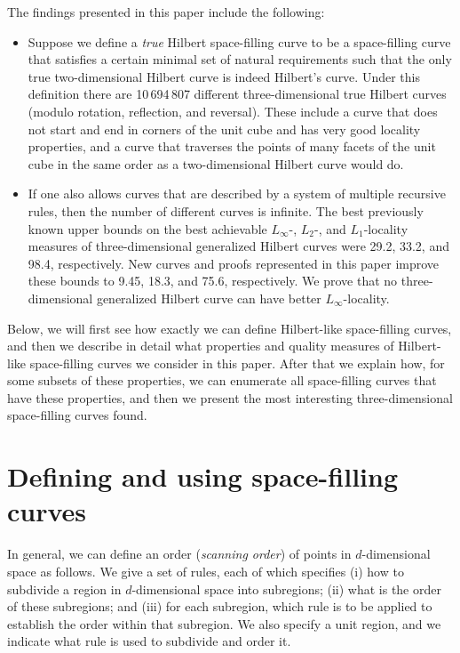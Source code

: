 \documentclass[11pt,a4paper]{article}
\begin{document}
The findings presented in this paper include the following:\begin{itemize}
\item Suppose we define a \emph{true} Hilbert space-filling curve to be a space-filling curve that satisfies a certain minimal set of natural requirements such that the only true two-dimensional Hilbert curve is indeed Hilbert's curve. Under this definition there are 10\,694\,807 different three-dimensional true Hilbert curves (modulo rotation, reflection, and reversal). These include a curve that does not start and end in corners of the unit cube and has very good locality properties, and a curve that traverses the points of many facets of the unit cube in the same order as a two-dimensional Hilbert curve would do.
\item If one also allows curves that are described by a system of multiple recursive rules, then the number of different curves is infinite.
    The best previously known upper bounds on the best achievable $L_\infty$-, $L_2$-, and $L_1$-locality measures of three-dimensional generalized Hilbert curves were 29.2, 33.2, and 98.4, respectively. New curves and proofs represented in this paper improve these bounds to 9.45, 18.3, and 75.6, respectively. We prove that no three-dimensional generalized Hilbert curve can have better $L_\infty$-locality.
\end{itemize}

Below, we will first see how exactly we can define Hilbert-like space-filling curves, and then we describe in detail what properties and quality measures of Hilbert-like space-filling curves we consider in this paper. After that we explain how, for some subsets of these properties, we can enumerate all space-filling curves that have these properties, and then we present the most interesting three-dimensional space-filling curves found.

\section{Defining and using space-filling curves}

In general, we can define an order (\emph{scanning order}) of points in $d$-dimensional space as follows. We give a set of rules, each of which specifies (i) how to subdivide a region in $d$-dimensional space into subregions; (ii) what is the order of these subregions; and (iii) for each subregion, which rule is to be applied to establish the order within that subregion. We also specify a unit region, and we indicate what rule is used to subdivide and order it.
\end{document}
